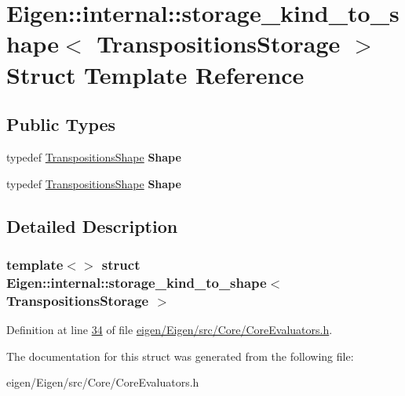 \hypertarget{struct_eigen_1_1internal_1_1storage__kind__to__shape_3_01_transpositions_storage_01_4}{}\section{Eigen\+:\+:internal\+:\+:storage\+\_\+kind\+\_\+to\+\_\+shape$<$ Transpositions\+Storage $>$ Struct Template Reference}
\label{struct_eigen_1_1internal_1_1storage__kind__to__shape_3_01_transpositions_storage_01_4}
\subsection*{Public Types}
\begin{DoxyCompactItemize}
\item 
\mbox{\label{struct_eigen_1_1internal_1_1storage__kind__to__shape_3_01_transpositions_storage_01_4_a79020d45c66fd714785824d42432fb82}} 
typedef \hyperlink{struct_eigen_1_1_transpositions_shape}{Transpositions\+Shape} {\bfseries Shape}
\item 
\mbox{\label{struct_eigen_1_1internal_1_1storage__kind__to__shape_3_01_transpositions_storage_01_4_a79020d45c66fd714785824d42432fb82}} 
typedef \hyperlink{struct_eigen_1_1_transpositions_shape}{Transpositions\+Shape} {\bfseries Shape}
\end{DoxyCompactItemize}


\subsection{Detailed Description}
\subsubsection*{template$<$$>$\newline
struct Eigen\+::internal\+::storage\+\_\+kind\+\_\+to\+\_\+shape$<$ Transpositions\+Storage $>$}



Definition at line \hyperlink{eigen_2_eigen_2src_2_core_2_core_evaluators_8h_source_l00034}{34} of file \hyperlink{eigen_2_eigen_2src_2_core_2_core_evaluators_8h_source}{eigen/\+Eigen/src/\+Core/\+Core\+Evaluators.\+h}.



The documentation for this struct was generated from the following file\+:\begin{DoxyCompactItemize}
\item 
eigen/\+Eigen/src/\+Core/\+Core\+Evaluators.\+h\end{DoxyCompactItemize}
